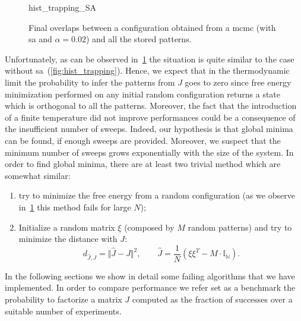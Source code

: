 \documentclass[\rootdir/main.tex]{subfiles}
\begin{document}
\begin{figure}[H]
    \centering
    {hist_trapping_SA}
    \caption{Final overlaps between a configuration obtained from a \acrshort{mcmc} (with \acrshort{sa} and $\alpha = 0.02$) and all the stored patterns.}
    \label{fig:hist_trapping_sa}
\end{figure}
Unfortunately, as can be observed in~\cref{fig:hist_trapping_sa} the situation is quite similar to the case without \acrlong{sa}~(\cref{fig:hist_trapping}). Hence, we expect that in the thermodynamic limit the probability to infer the patterns from $J$ goes to zero since free energy minimization performed on any initial random configuration returns a state which is orthogonal to all the patterns. Moreover, the fact that the introduction of a finite temperature did not improve performances could be a consequence of the insufficient number of sweeps. Indeed, our hypothesis is that global minima can be found, if enough sweeps are provided. Moreover, we suspect that the minimum number of sweeps grows exponentially with the size of the system.  
In order to find global minima, there are at least two trivial method which are somewhat similar:
\begin{enumerate}
    \item try to minimize the free energy from a random configuration (as we observe in~\cref{fig:hist_trapping_sa} this method fails for large $N$);
    \item Initialize a random matrix $\xi$ (composed by $M$ random patterns) and try to minimize the distance with $J$:
    \begin{equation}\label{eq:distance}
        d_{\hat{J}, J} = \Vert \hat{J} - J \Vert^2, \qquad \hat{J} = \frac{1}{N}\left( \xi \xi^T - M \cdot \mathbb{I_N} \right).
    \end{equation}
\end{enumerate}
In the following sections we show in detail some failing algorithms that we have implemented. In order to compare performance we refer set as a benchmark the probability to factorize a matrix $J$ computed as the fraction of successes over a suitable number of experiments.
\end{document}
